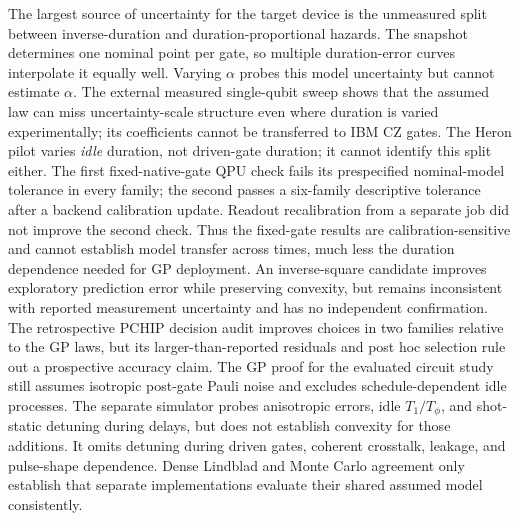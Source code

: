 \documentclass[10pt,letterpaper,journal]{IEEEtran}
\begin{document}
The largest source of uncertainty for the target device is the unmeasured split between inverse-duration and duration-proportional hazards. The snapshot determines one nominal point per gate, so multiple duration-error curves interpolate it equally well. Varying $\alpha$ probes this model uncertainty but cannot estimate $\alpha$. The external measured single-qubit sweep shows that the assumed law can miss uncertainty-scale structure even where duration is varied experimentally; its coefficients cannot be transferred to IBM CZ gates. The Heron pilot varies \emph{idle} duration, not driven-gate duration; it cannot identify this split either. The first fixed-native-gate QPU check fails its prespecified nominal-model tolerance in every family; the second passes a six-family descriptive tolerance after a backend calibration update. Readout recalibration from a separate job did not improve the second check. Thus the fixed-gate results are calibration-sensitive and cannot establish model transfer across times, much less the duration dependence needed for GP deployment. An inverse-square candidate improves exploratory prediction error while preserving convexity, but remains inconsistent with reported measurement uncertainty and has no independent confirmation. The retrospective PCHIP decision audit improves choices in two families relative to the GP laws, but its larger-than-reported residuals and post hoc selection rule out a prospective accuracy claim. The GP proof for the evaluated circuit study still assumes isotropic post-gate Pauli noise and excludes schedule-dependent idle processes. The separate simulator probes anisotropic errors, idle $T_1/T_\phi$, and shot-static detuning during delays, but does not establish convexity for those additions. It omits detuning during driven gates, coherent crosstalk, leakage, and pulse-shape dependence. Dense Lindblad and Monte Carlo agreement only establish that separate implementations evaluate their shared assumed model consistently.
\end{document}
